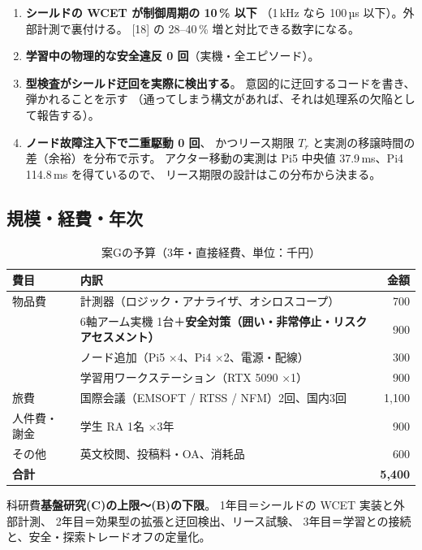 \documentclass[11pt,a4paper]{article}
\newcommand{\keyp}[1]{\textbf{\textcolor{blue!45!black}{#1}}}
\begin{document}
\begin{enumerate}[leftmargin=1.8em,itemsep=3pt]
  \item \keyp{シールドの WCET が制御周期の 10\,\% 以下}
        （1\,kHz なら 100\,µs 以下）。外部計測で裏付ける。
        [18] の 28--40\,\% 増と対比できる数字になる。
  \item \keyp{学習中の物理的な安全違反 0 回}（実機・全エピソード）。
  \item \keyp{型検査がシールド迂回を実際に検出する}。
        意図的に迂回するコードを書き、弾かれることを示す
        （通ってしまう構文があれば、それは処理系の欠陥として報告する）。
  \item \keyp{ノード故障注入下で二重駆動 0 回}、
        かつリース期限 $T_r$ と実測の移譲時間の差（余裕）を分布で示す。
        アクター移動の実測は Pi5 中央値 37.9\,ms、Pi4 114.8\,ms を得ているので、
        リース期限の設計はこの分布から決まる。
\end{enumerate}

\subsection{規模・経費・年次}

\begin{table}[htbp]
\centering
\small
\caption{案Gの予算（3年・直接経費、単位：千円）}
\begin{tabularx}{\textwidth}{@{}l X r@{}}
\toprule
\textbf{費目} & \textbf{内訳} & \textbf{金額} \\
\midrule
物品費 & 計測器（ロジック・アナライザ、オシロスコープ） & 700 \\
       & 6軸アーム実機 1台＋\keyp{安全対策（囲い・非常停止・リスクアセスメント）} & 900 \\
       & ノード追加（Pi5 ×4、Pi4 ×2、電源・配線） & 300 \\
       & 学習用ワークステーション（RTX 5090 ×1） & 900 \\
\midrule
旅費 & 国際会議（EMSOFT / RTSS / NFM）2回、国内3回 & 1,100 \\
\midrule
人件費・謝金 & 学生 RA 1名 ×3年 & 900 \\
\midrule
その他 & 英文校閲、投稿料・OA、消耗品 & 600 \\
\midrule
\textbf{合計} & & \textbf{5,400} \\
\bottomrule
\end{tabularx}
\end{table}

\noindent
科研費\keyp{基盤研究(C)の上限〜(B)の下限}。
1年目＝シールドの WCET 実装と外部計測、
2年目＝効果型の拡張と迂回検出、リース試験、
3年目＝学習との接続と、安全・探索トレードオフの定量化。
\end{document}

